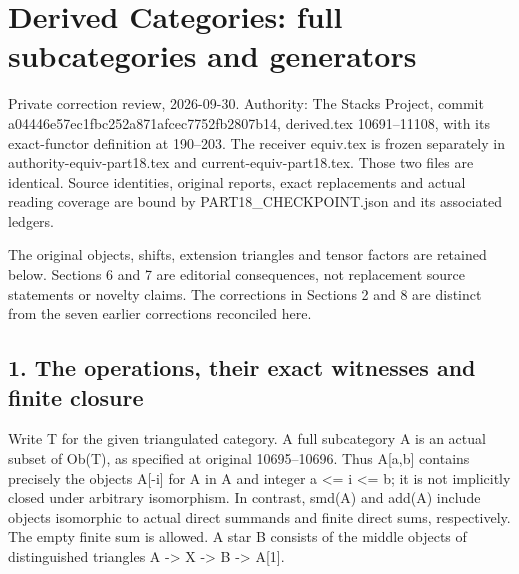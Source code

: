 \section{\texorpdfstring{Derived Categories:\allowbreak{} full subcategories and generators}{Derived  full subcategories and generators}}\label{proofs-10691-11108-derived-categories-full-subcategories-and-generators}

Private correction review,\allowbreak{} 2026-09-30. Authority:\allowbreak{} The Stacks Project,\allowbreak{} commit a04446e5\allowbreak{}7ec1fbc2\allowbreak{}52a871af\allowbreak{}cec7752f\allowbreak{}b2807b14, derived.tex 10691–\allowbreak{}11108,\allowbreak{} with its exact-functor definition at 190–\allowbreak{}203. The receiver equiv.tex is frozen separately in authority-equiv-part18.tex and current-equiv-part18.tex. Those two files are identical. Source identities,\allowbreak{} original reports,\allowbreak{} exact replacements and actual reading coverage are bound by PART18\_\allowbreak{}CHECKPOINT.json and its associated ledgers.

The original objects,\allowbreak{} shifts,\allowbreak{} extension triangles and tensor factors are retained below. Sections 6 and 7 are editorial consequences,\allowbreak{} not replacement source statements or novelty claims. The corrections in Sections 2 and 8 are distinct from the seven earlier corrections reconciled here.

\subsection{\texorpdfstring{1. The operations,\allowbreak{} their exact witnesses and finite closure}{1. The  their exact witnesses and finite closure}}\label{proofs-10691-11108-the-operations-their-exact-witnesses-and-finite-closure}

Write T for the given triangulated category. A full subcategory A is an actual subset of Ob(T)\allowbreak{},\allowbreak{} as specified at original 10695–\allowbreak{}10696. Thus A[a,\allowbreak{}b]\allowbreak{} contains precisely the objects A[-i]\allowbreak{} for A in A and integer a <\allowbreak{}= i <\allowbreak{}= b; it is not implicitly closed under arbitrary isomorphism. In contrast,\allowbreak{} smd(A)\allowbreak{} and add(A)\allowbreak{} include objects isomorphic to actual direct summands and finite direct sums,\allowbreak{} respectively. The empty finite sum is allowed. A star B consists of the middle objects of distinguished triangles A \allowbreak{}-> X \allowbreak{}-> B \allowbreak{}-> A[1]\allowbreak{}.

